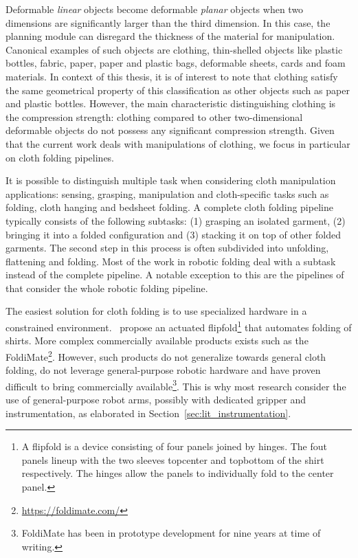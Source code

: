 \documentclass[\home/main.tex]{subfiles}
\begin{document}
Deformable \textit{linear} objects become deformable \textit{planar} objects when two dimensions are significantly larger than the third dimension. In this case, the planning module can disregard the thickness of the material for manipulation. Canonical examples of such objects are clothing, thin-shelled objects like plastic bottles, fabric, paper, paper and plastic bags, deformable sheets, cards and foam materials. In context of this thesis, it is of interest to note that clothing satisfy the same geometrical property of this classification as other objects such as paper and plastic bottles. However, the main characteristic distinguishing clothing is the compression strength: clothing compared to other two-dimensional deformable objects do not possess any significant compression strength. Given that the current work deals with manipulations of clothing, we focus in particular on cloth folding pipelines.

It is possible to distinguish multiple task when considering cloth manipulation applications: sensing, grasping, manipulation and cloth-specific tasks such as folding, cloth hanging and bedsheet folding. A complete cloth folding pipeline typically consists of the following subtasks: (1) grasping an isolated garment, (2) bringing it into a folded configuration and (3) stacking it on top of other folded garments. The second step in this process is often subdivided into unfolding, flattening and folding. Most of the work in robotic folding deal with a subtask instead of the complete pipeline. A notable exception to this are the pipelines of~\textcite{Doumanoglou2016,Maitin2010} that consider the whole robotic folding pipeline.

The easiest solution for cloth folding is to use specialized hardware in a constrained environment.~\Textcite{Nair2013} propose an actuated flipfold\footnote{A flipfold is a device consisting of four panels joined by hinges. The fout panels lineup with the two sleeves topcenter and topbottom of the shirt respectively. The hinges allow the panels to individually fold to the center panel.} that automates folding of shirts. More complex commercially available products exists such as the FoldiMate\footnote{\url{https://foldimate.com/}}. However, such products do not generalize towards general cloth folding, do not leverage general-purpose robotic hardware and have proven difficult to bring commercially available\footnote{FoldiMate has been in prototype development for nine years at time of writing.}. This is why most research consider the use of general-purpose robot arms, possibly with dedicated gripper and instrumentation, as elaborated in Section~\ref{sec:lit_instrumentation}. 
\end{document}
